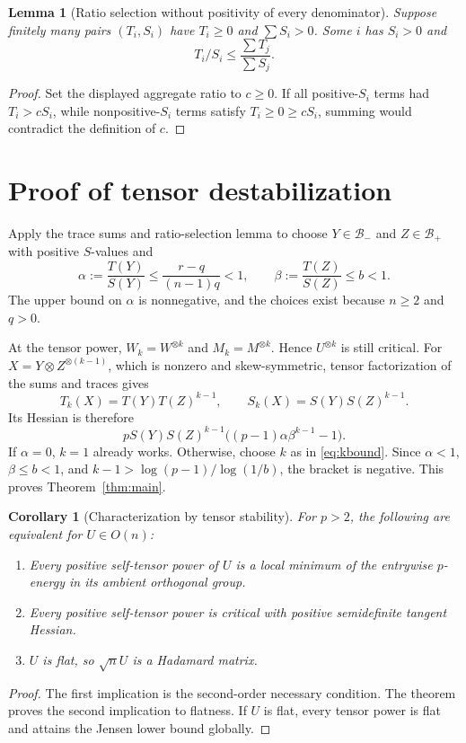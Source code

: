 \documentclass[11pt]{article}
\newtheorem{lemma}[theorem]{Lemma}
\newtheorem{corollary}[theorem]{Corollary}
\begin{document}
\begin{lemma}[Ratio selection without positivity of every denominator]
Suppose finitely many pairs $(T_i,S_i)$ have $T_i\ge0$ and
$\sum S_i>0$. Some $i$ has $S_i>0$ and
\[
 T_i/S_i\le\frac{\sum T_j}{\sum S_j}.
\]
\end{lemma}
\begin{proof}
Set the displayed aggregate ratio to $c\ge0$. If all positive-$S_i$
terms had $T_i>cS_i$, while nonpositive-$S_i$ terms satisfy
$T_i\ge0\ge cS_i$, summing would contradict the definition of $c$.
\end{proof}

\section{Proof of tensor destabilization}
Apply the trace sums and ratio-selection lemma to choose $Y\in
\mathcal B_-$ and $Z\in\mathcal B_+$ with positive $S$-values and
\[
 \alpha:=\frac{T(Y)}{S(Y)}
 \le\frac{r-q}{(n-1)q}<1,\qquad
 \beta:=\frac{T(Z)}{S(Z)}\le b<1.
\]
The upper bound on $\alpha$ is nonnegative, and the choices exist
because $n\ge2$ and $q>0$.

At the tensor power, $W_k=W^{\otimes k}$ and $M_k=M^{\otimes k}$.
Hence $U^{\otimes k}$ is still critical. For
$X=Y\otimes Z^{\otimes(k-1)}$, which is nonzero and skew-symmetric,
tensor factorization of the sums and traces gives
\[
 T_k(X)=T(Y)T(Z)^{k-1},\qquad
 S_k(X)=S(Y)S(Z)^{k-1}.
\]
Its Hessian is therefore
\begin{equation}\label{eq:tensorhessian}
 pS(Y)S(Z)^{k-1}
 \bigl((p-1)\alpha\beta^{k-1}-1\bigr).
\end{equation}
If $\alpha=0$, $k=1$ already works. Otherwise, choose $k$ as in
\eqref{eq:kbound}. Since $\alpha<1$, $\beta\le b<1$, and
$k-1>\log(p-1)/\log(1/b)$, the bracket is negative. This proves
Theorem~\ref{thm:main}.

\begin{corollary}[Characterization by tensor stability]
For $p>2$, the following are equivalent for $U\in O(n)$:
\begin{enumerate}
\item Every positive self-tensor power of $U$ is a local minimum of
the entrywise $p$-energy in its ambient orthogonal group.
\item Every positive self-tensor power is critical with positive
semidefinite tangent Hessian.
\item $U$ is flat, so $\sqrt nU$ is a Hadamard matrix.
\end{enumerate}
\end{corollary}
\begin{proof}
The first implication is the second-order necessary condition. The
theorem proves the second implication to flatness. If $U$ is flat,
every tensor power is flat and attains the Jensen lower bound globally.
\end{proof}
\end{document}
